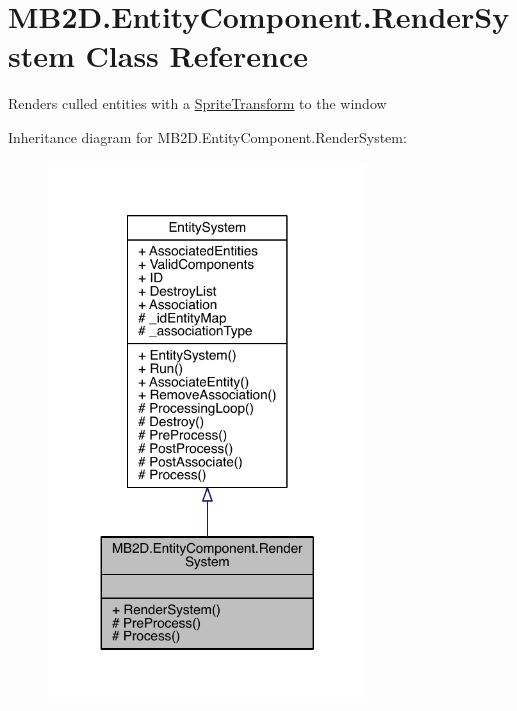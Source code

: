 \hypertarget{class_m_b2_d_1_1_entity_component_1_1_render_system}{}\section{M\+B2\+D.\+Entity\+Component.\+Render\+System Class Reference}
\label{class_m_b2_d_1_1_entity_component_1_1_render_system}


Renders culled entities with a \hyperlink{class_m_b2_d_1_1_entity_component_1_1_sprite_transform}{Sprite\+Transform} to the window  




Inheritance diagram for M\+B2\+D.\+Entity\+Component.\+Render\+System\+:\nopagebreak
\begin{figure}[H]
\begin{center}
\leavevmode
\includegraphics[width=239pt]{class_m_b2_d_1_1_entity_component_1_1_render_system__inherit__graph}
\end{center}
\end{figure}


